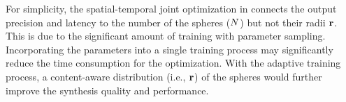 For simplicity, the spatial-temporal joint optimization in  connects the output precision and latency to the number of the spheres ($N$) but not their radii $\mathbf{r}$. This is due to the significant amount of training with parameter sampling. Incorporating the parameters into a single training process may significantly reduce the time consumption for the optimization. With the adaptive training process, a content-aware distribution (i.e., $\mathbf{r}$) of the spheres would further improve the synthesis quality and performance.

